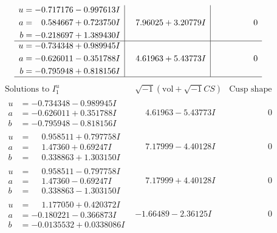 \documentclass[1p]{elsarticle_modified}
\theoremstyle{definition}
\newcommand{\I}{\sqrt{-1}}
\begin{document}
$$\begin{array}{c|c|c}
\begin{aligned}
u &= -0.717176 - 0.997613 I \\
a &= \phantom{-}0.584667 + 0.723750 I \\
b &= -0.218697 + 1.389430 I\end{aligned}
 & \phantom{-}7.96025 + 3.20779 I & \phantom{-0.000000 } 0 \\ \hline\begin{aligned}
u &= -0.734348 + 0.989945 I \\
a &= -0.626011 - 0.351788 I \\
b &= -0.795948 + 0.818156 I\end{aligned}
 & \phantom{-}4.61963 + 5.43773 I & \phantom{-0.000000 } 0\\
 \hline 
 \end{array}$$\newpage$$\begin{array}{c|c|c}  
\text{Solutions to }I^u_{1}& \I (\text{vol} + \sqrt{-1}CS) & \text{Cusp shape}\\
 \hline 
\begin{aligned}
u &= -0.734348 - 0.989945 I \\
a &= -0.626011 + 0.351788 I \\
b &= -0.795948 - 0.818156 I\end{aligned}
 & \phantom{-}4.61963 - 5.43773 I & \phantom{-0.000000 } 0 \\ \hline\begin{aligned}
u &= \phantom{-}0.958511 + 0.797758 I \\
a &= \phantom{-}1.47360 + 0.69247 I \\
b &= \phantom{-}0.338863 + 1.303150 I\end{aligned}
 & \phantom{-}7.17999 - 4.40128 I & \phantom{-0.000000 } 0 \\ \hline\begin{aligned}
u &= \phantom{-}0.958511 - 0.797758 I \\
a &= \phantom{-}1.47360 - 0.69247 I \\
b &= \phantom{-}0.338863 - 1.303150 I\end{aligned}
 & \phantom{-}7.17999 + 4.40128 I & \phantom{-0.000000 } 0 \\ \hline\begin{aligned}
u &= \phantom{-}1.177050 + 0.420372 I \\
a &= -0.180221 - 0.366873 I \\
b &= -0.0135532 + 0.0338086 I\end{aligned}
 & -1.66489 - 2.36125 I & \phantom{-0.000000 } 0 \\ \hline\begin{aligned}

\end{aligned}
\end{array}$$
\end{document}
